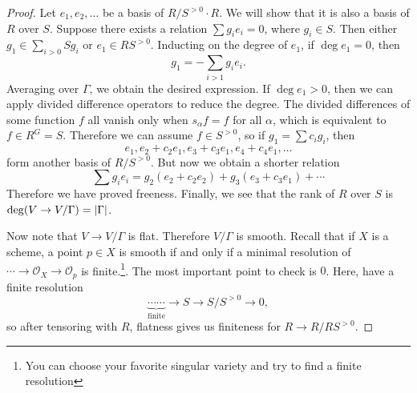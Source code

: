 \documentclass[leqno, openany]{memoir}
\theoremstyle{definition}
\theoremstyle{remark}
\theoremstyle{plain}
\theoremstyle{definition}
\theoremstyle{remark}
\newcommand{\mc}[1]{\mathcal{#1}}
\begin{document}
\begin{proof}
    Let $e_1, e_2, \ldots$ be a basis of $R/S^{>0} \cdot R$. We will show that it is also a basis of $R$ over $S$. Suppose there exists a relation $\sum g_i e_i = 0$, where $g_i \in S$. Then either $g_1 \in \sum_{i > 0} S g_i$ or $e_1 \in RS^{>0}$. Inducting on the degree of $e_1$, if $\deg e_1 = 0$, then
    \[ g_1 = - \sum_{i > 1} g_i e_i. \]
    Averaging over $\Gamma$, we obtain the desired expression. If $\deg e_1 > 0$, then we can apply divided difference operators to reduce the degree. The divided differences of some function $f$ all vanish only when $s_{\alpha} f = f$ for all $\alpha$, which is equivalent to $f \in R^G = S$. Therefore we can assume $f \in S^{>0}$, so if $g_1 = \sum c_i g_i$, then
    \[ e_1, e_2 + c_2 e_1, e_3 + c_3 e_1, e_4 + c_4 e_1, \ldots \]
    form another basis of $R/S^{>0}$. But now we obtain a shorter relation
    \[ \sum g_i e_i = g_2 (e_2 + c_2 e_2) + g_3(e_3 + c_3 e_1) + \cdots \]
    Therefore we have proved freeness. Finally, we see that the rank of $R$ over $S$ is $\deg (V \to V/\Gamma) = \abs{\Gamma}$.

    Now note that $V \to V/\Gamma$ is flat. Therefore $V/\Gamma$ is smooth. Recall that if $X$ is a scheme, a point $p \in X$ is smooth if and only if a minimal resolution of $\cdots \to \mc{O}_X \to \mc{O}_p$ is finite.\footnote{You can choose your favorite singular variety and try to find a finite resolution}. The most important point to check is $0$. Here, have a finite resolution
    \[ \underbrace{\cdots \cdots}_{\text{finite}} \to S \to S/S^{>0} \to 0, \]
    so after tensoring with $R$, flatness gives us finiteness for $R \to R/RS^{>0}$.


\end{proof}
\end{document}
